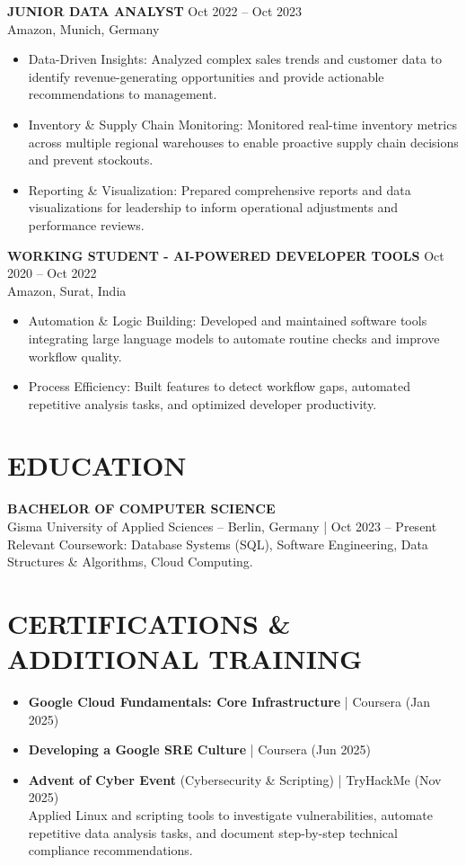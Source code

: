 \documentclass[11pt,a4paper]{article}
\newcommand{\cventry}[4]{
    \noindent\textbf{#1} \hfill {\small\color{lightgray}#2} \\
    {\small\color{lightgray}#3} \\
    #4
    \vspace{6pt}
}
\newcommand{\cvsubentry}[3]{
    \noindent\textbf{#1} \\
    {\small\color{lightgray}#2} \\
    #3
    \vspace{4pt}
}
\newcommand{\cvitem}[1]{
    \item #1
}
\begin{document}
\cventry{JUNIOR DATA ANALYST}{Oct 2022 – Oct 2023}{Amazon, Munich, Germany}
{
\begin{itemize}[leftmargin=15pt, itemsep=3pt]
    \cvitem{Data-Driven Insights: Analyzed complex sales trends and customer data to identify revenue-generating opportunities and provide actionable recommendations to management.}
    \cvitem{Inventory \& Supply Chain Monitoring: Monitored real-time inventory metrics across multiple regional warehouses to enable proactive supply chain decisions and prevent stockouts.}
    \cvitem{Reporting \& Visualization: Prepared comprehensive reports and data visualizations for leadership to inform operational adjustments and performance reviews.}
\end{itemize}
}

\cventry{WORKING STUDENT - AI-POWERED DEVELOPER TOOLS}{Oct 2020 – Oct 2022}{Amazon, Surat, India}
{
\begin{itemize}[leftmargin=15pt, itemsep=3pt]
    \cvitem{Automation \& Logic Building: Developed and maintained software tools integrating large language models to automate routine checks and improve workflow quality.}
    \cvitem{Process Efficiency: Built features to detect workflow gaps, automated repetitive analysis tasks, and optimized developer productivity.}
\end{itemize}
}

\section{EDUCATION}

\cvsubentry{BACHELOR OF COMPUTER SCIENCE}{Gisma University of Applied Sciences – Berlin, Germany | Oct 2023 – Present}
{
Relevant Coursework: Database Systems (SQL), Software Engineering, Data Structures \& Algorithms, Cloud Computing.
}

\section{CERTIFICATIONS \& ADDITIONAL TRAINING}

\begin{itemize}[leftmargin=15pt, itemsep=4pt]
    \cvitem{\textbf{Google Cloud Fundamentals: Core Infrastructure} | Coursera (Jan 2025)}
    \cvitem{\textbf{Developing a Google SRE Culture} | Coursera (Jun 2025)}
    \cvitem{\textbf{Advent of Cyber Event} (Cybersecurity \& Scripting) | TryHackMe (Nov 2025) \\
    Applied Linux and scripting tools to investigate vulnerabilities, automate repetitive data analysis tasks, and document step-by-step technical compliance recommendations.}
\end{itemize}
\end{document}
